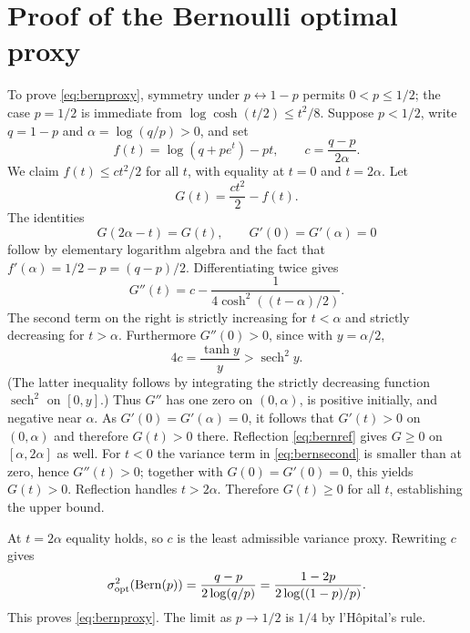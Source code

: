 \documentclass[11pt,a4paper]{article}
\begin{document}
\section{Proof of the Bernoulli optimal proxy}\label{app:bernoulli}
To prove \eqref{eq:bernproxy}, symmetry under $p\leftrightarrow1-p$ permits $0<p\le1/2$; the case $p=1/2$ is immediate from $\log\cosh(t/2)\le t^2/8$. Suppose $p<1/2$, write $q=1-p$ and $\alpha=\log(q/p)>0$, and set
\[
 f(t)=\log(q+pe^t)-pt,\qquad
 c=\frac{q-p}{2\alpha}.
\]
We claim $f(t)\le ct^2/2$ for all $t$, with equality at $t=0$ and $t=2\alpha$. Let
\[
 G(t)=\frac{ct^2}{2}-f(t).
\]
The identities
\begin{equation}\label{eq:bernref}
 G(2\alpha-t)=G(t),\qquad
 G'(0)=G'(\alpha)=0
\end{equation}
follow by elementary logarithm algebra and the fact that $f'(\alpha)=1/2-p=(q-p)/2$. Differentiating twice gives
\begin{equation}\label{eq:bernsecond}
 G''(t)=c-\frac1{4\cosh^2((t-\alpha)/2)}.
\end{equation}
The second term on the right is strictly increasing for $t<\alpha$ and strictly decreasing for $t>\alpha$. Furthermore $G''(0)>0$, since with $y=\alpha/2$,
\[
 4c=\frac{\tanh y}{y}>\operatorname{sech}^2 y.
\]
(The latter inequality follows by integrating the strictly decreasing function $\operatorname{sech}^2$ on $[0,y]$.) Thus $G''$ has one zero on $(0,\alpha)$, is positive initially, and negative near $\alpha$. As $G'(0)=G'(\alpha)=0$, it follows that $G'(t)>0$ on $(0,\alpha)$ and therefore $G(t)>0$ there. Reflection \eqref{eq:bernref} gives $G\ge0$ on $[\alpha,2\alpha]$ as well. For $t<0$ the variance term in \eqref{eq:bernsecond} is smaller than at zero, hence $G''(t)>0$; together with $G(0)=G'(0)=0$, this yields $G(t)>0$. Reflection handles $t>2\alpha$. Therefore $G(t)\ge0$ for all $t$, establishing the upper bound.

At $t=2\alpha$ equality holds, so $c$ is the least admissible variance proxy. Rewriting $c$ gives
\[
 \sigma^2_{\mathrm{opt}}(\operatorname{Bern}(p))
 =\frac{q-p}{2\log(q/p)}=
 \frac{1-2p}{2\log((1-p)/p)}.
\]
This proves \eqref{eq:bernproxy}. The limit as $p\to1/2$ is $1/4$ by l'H\^opital's rule.


\end{document}
